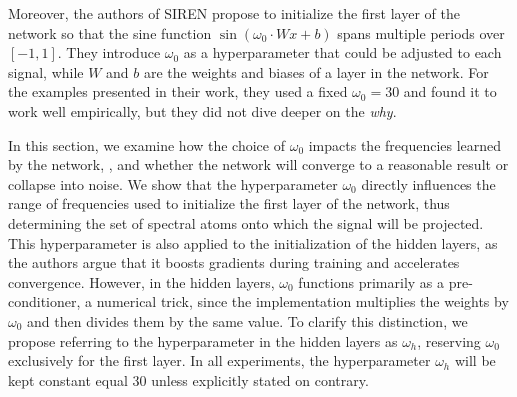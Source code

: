 
Moreover, the authors of SIREN propose to initialize the first layer of the network so that the sine function $\sin(\omega_0 \cdot W x + b)$ spans multiple periods over $[-1, 1]$. They introduce $\omega_0$ as a hyperparameter that could be adjusted to each signal, while $W$ and $b$ are the weights and biases of a layer in the network. For the examples presented in their work, they used a fixed $\omega_0=30$ and found it to work well empirically, but they did not dive deeper on the \emph{why}.



In this section, we examine how the choice of \(\omega_0\) impacts the frequencies learned by the network, , and whether the network will converge to a reasonable result or collapse into noise. We show that the hyperparameter \(\omega_0\) directly influences the range of frequencies used to initialize the first layer of the network, thus determining the set of spectral atoms onto which the signal will be projected. This hyperparameter is also applied to the initialization of the hidden layers, as the authors argue that it boosts gradients during training and accelerates convergence. However, in the hidden layers, \(\omega_0\) functions primarily as a pre-conditioner, a numerical trick, since the implementation multiplies the weights by \(\omega_0\) and then divides them by the same value. To clarify this distinction, we propose referring to the hyperparameter in the hidden layers as \(\omega_h\), reserving \(\omega_0\) exclusively for the first layer. In all experiments, the hyperparameter $\omega_h$ will be kept constant equal 30 unless explicitly stated on contrary.

